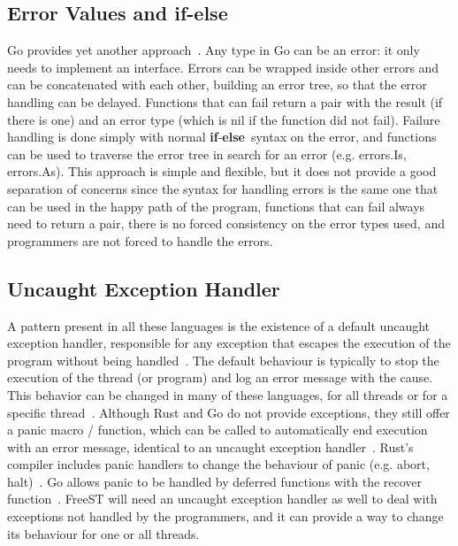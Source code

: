 \documentclass[sigplan]{acmart}
\newcommand{\syntax}[1]{\textbf{#1}}
\newcommand{\ifb}{\syntax{if}}
\newcommand{\elsebb}{\syntax{else}}
\begin{document}
\subsection{Error Values and \ifb-\elsebb}

Go provides yet another approach~\cite{gobook,goeh}.
Any type in Go can be an error: it only needs to implement an interface.
Errors can be wrapped inside other errors and can be concatenated with each other, building an error tree, so that the error handling can be delayed.
Functions that can fail return a pair with the result (if there is one) and an error type (which is nil if the function did not fail).
Failure handling is done simply with normal \ifb-\elsebb~syntax on the error, and functions can be used to traverse the error tree in search for an error (e.g. errors.Is, errors.As).
This approach is simple and flexible, but it does not provide a good separation of concerns since the syntax for handling errors is the same one that can be used in the happy path of the program, functions that can fail always need to return a pair, there is no forced consistency on the error types used, and programmers are not forced to handle the errors.

\subsection{Uncaught Exception Handler}

A pattern present in all these languages is the existence of a default uncaught exception handler, responsible for any exception that escapes the execution of the program without being handled~\cite{ehuncaught}.
The default behaviour is typically to stop the execution of the thread (or program) and log an error message with the cause.
This behavior can be changed in many of these languages, for all threads or for a specific thread~\cite{javaueh,kotlincoroutineseh,haskellueh,ocamlueh}.
Although Rust and Go do not provide exceptions, they still offer a panic macro / function, which can be called to automatically end execution with an error message, identical to an uncaught exception handler~\cite{rustbook,gobook}.
Rust's compiler includes panic handlers to change the behaviour of panic (e.g. abort, halt)~\cite{rustbook}.
Go allows panic to be handled by deferred functions with the recover function~\cite{gobook}.
FreeST will need an uncaught exception handler as well to deal with exceptions not handled by the programmers, and it can provide a way to change its behaviour for one or all threads.
\end{document}
